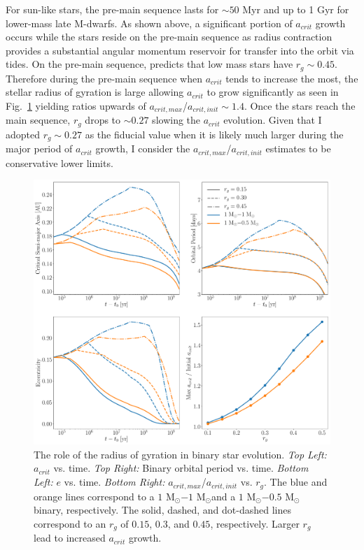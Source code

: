 For sun-like stars, the pre-main sequence lasts for ${\sim} 50$ Myr and up to 1 Gyr for lower-mass late M-dwarfs.  As shown above, a significant portion of  $a_{crit}$ growth occurs while the stars reside on the pre-main sequence as radius contraction provides a substantial angular momentum reservoir for transfer into the orbit via tides.  On the pre-main sequence, \citet{Baraffe2015} predicts that low mass stars have $r_{g}{\sim}0.45$.  Therefore during the pre-main sequence when $a_{crit}$ tends to increase the most, the stellar radius of gyration is large allowing $a_{crit}$ to grow significantly as seen in Fig.~\ref{STEEP:fig:var_rg} yielding ratios upwards of $a_{crit,max}$/$a_{crit,init} {\sim} 1.4$.  Once the stars reach the main sequence, $r_{g}$ drops to ${\sim}0.27$ slowing the $a_{crit}$ evolution.  Given that I adopted $r_{g}{\sim}0.27$ as the fiducial value when it is likely much larger during the major period of $a_{crit}$ growth, I consider the $a_{crit,max}$/$a_{crit,init}$ estimates to be conservative lower limits. 

\begin{figure}
	\includegraphics[width=\columnwidth]{var_rg.pdf}
    \caption{The role of the radius of gyration in binary star evolution. {\it Top Left:} $a_{crit}$ vs. time.  {\it Top Right:} Binary orbital period vs. time. {\it Bottom Left:} $e$ vs. time. {\it Bottom Right:} $a_{crit,max}$/$a_{crit,init}$ vs. $r_g$.  The blue and orange lines correspond to a $1$ M$_{\odot}$$-1$ M$_{\odot}$and a $1$ M$_{\odot}$$-0.5$ M$_{\odot}$ binary, respectively.  The solid, dashed, and dot-dashed lines correspond to an $r_g$ of $0.15$, $0.3$, and $0.45$, respectively.  Larger $r_g$ lead to increased $a_{crit}$ growth.}
    \label{STEEP:fig:var_rg}
\end{figure}

